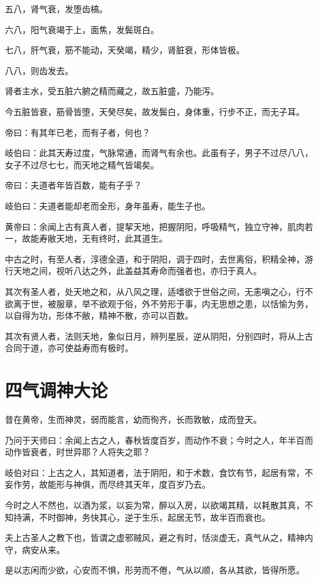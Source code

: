 \documentclass{article}%
\begin{document}
五八，肾气衰，发堕齿槁。

六八，阳气衰竭于上，面焦，发鬓斑白。

七八，肝气衰，筋不能动，天癸竭，精少，肾脏衰，形体皆极。

八八，则齿发去。

肾者主水，受五脏六腑之精而藏之，故五脏盛，乃能泻。

今五脏皆衰，筋骨皆堕，天癸尽矣，故发鬓白，身体重，行步不正，而无子耳。

帝曰：有其年已老，而有子者，何也？

岐伯曰：此其天寿过度，气脉常通，而肾气有余也。此虽有子，男子不过尽八八，女子不过尽七七，而天地之精气皆竭矣。

帝曰：夫道者年皆百数，能有子乎？

岐伯曰：夫道者能却老而全形，身年虽寿，能生子也。

黄帝曰：余闻上古有真人者，提挈天地，把握阴阳，呼吸精气，独立守神，肌肉若一，故能寿敝天地，无有终时，此其道生。

中古之时，有至人者，淳德全道，和于阴阳，调于四时，去世离俗，积精全神，游行天地之间，视听八达之外，此盖益其寿命而强者也，亦归于真人。

其次有圣人者，处天地之和，从八风之理，适嗜欲于世俗之间，无恚嗔之心，行不欲离于世，被服章，举不欲观于俗，外不劳形于事，内无思想之患，以恬愉为务，以自得为功，形体不敝，精神不散，亦可以百数。

其次有贤人者，法则天地，象似日月，辨列星辰，逆从阴阳，分别四时，将从上古合同于道，亦可使益寿而有极时。

\section{四气调神大论}
昔在黄帝，生而神灵，弱而能言，幼而徇齐，长而敦敏，成而登天。

乃问于天师曰：余闻上古之人，春秋皆度百岁，而动作不衰；今时之人，年半百而动作皆衰者，时世异耶？人将失之耶？

岐伯对曰：上古之人，其知道者，法于阴阳，和于术数，食饮有节，起居有常，不妄作劳，故能形与神俱，而尽终其天年，度百岁乃去。

今时之人不然也，以酒为浆，以妄为常，醉以入房，以欲竭其精，以耗散其真，不知持满，不时御神，务快其心，逆于生乐，起居无节，故半百而衰也。

夫上古圣人之教下也，皆谓之虚邪贼风，避之有时，恬淡虚无，真气从之，精神内守，病安从来。

是以志闲而少欲，心安而不惧，形劳而不倦，气从以顺，各从其欲，皆得所愿。
\end{document}
